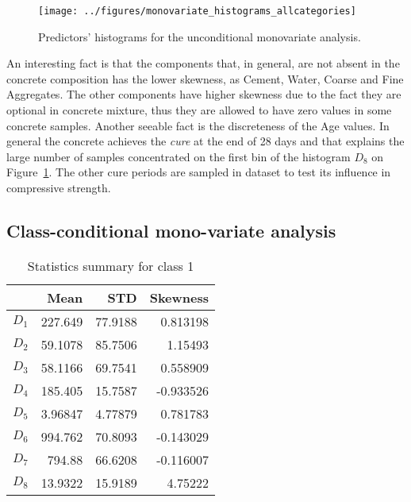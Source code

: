 \documentclass[conference]{IEEEtran}
\begin{document}
\begin{figure}[htbp]
\centerline{\texttt{[image: ../figures/monovariate\_histograms\_allcategories]}}
\caption{Predictors' histograms for the unconditional monovariate analysis.}
\label{uncond_monovariate}
\end{figure}

An interesting fact is that the components that, in general, are not absent in the concrete composition has the lower skewness, as Cement, Water, Coarse and Fine Aggregates. The other components have higher skewness due to the fact they are optional in concrete mixture, thus they are allowed to have zero values in some concrete samples. Another seeable fact is the discreteness of the Age values. In general the concrete achieves the \emph{cure} at the end of 28 days and that explains the large number of samples concentrated on the first bin of the histogram $D_8$ on Figure~\ref{uncond_monovariate}. The other cure periods are sampled in dataset to test its influence in compressive strength.

\subsection{Class-conditional mono-variate analysis}

\begin{table}[htp]
  \caption{Statistics summary for class 1}
    \centering
    \begin{tabular}{@{} crrr @{}}
      \toprule
       & Mean & STD & Skewness \\ 
      \midrule
      $D_1$ & 227.649  &   77.9188  &   0.813198 \\ 
      $D_2$ & 59.1078  &  85.7506  &   1.15493 \\ 
      $D_3$ & 58.1166  &  69.7541   &  0.558909 \\ 
      $D_4$ & 185.405  &   15.7587  &  -0.933526\\ 
      $D_5$ & 3.96847  &  4.77879  &  0.781783 \\ 
      $D_6$ & 994.762   &  70.8093  &  -0.143029 \\ 
      $D_7$ & 794.88   &   66.6208  &  -0.116007 \\ 
      $D_8$ & 13.9322  &  15.9189  &   4.75222 \\       
      \bottomrule
    \end{tabular}
  \label{statistics_table_class_1}
  \end{table}%
\end{document}
